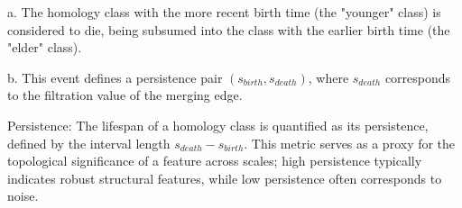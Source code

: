 \documentclass{ws-mplb}
\begin{document}
a.	The homology class with the more recent birth time (the "younger" class) is considered to die, being subsumed into the class with the earlier birth time (the "elder" class).

b.	This event defines a persistence pair $(s_{birth}, s_{death})$, where $s_{death}$ corresponds to the filtration value of the merging edge.

Persistence: The lifespan of a homology class is quantified as its persistence, defined by the interval length $s_{death} - s_{birth}$. This metric serves as a proxy for the topological significance of a feature across scales; high persistence typically indicates robust structural features, while low persistence often corresponds to noise.


%
%
%
%
%
%




\end{document}
